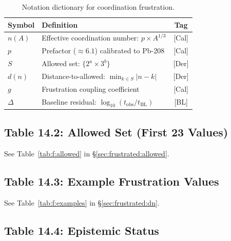 \begin{table}[h]
\centering
\caption{Notation dictionary for coordination frustration.}
\label{tab:f:notation}
\begin{tabular}{lp{7cm}c}
    \toprule
    Symbol & Definition & Tag \\
    \midrule
    $n(A)$ & Effective coordination number: $p \times A^{1/3}$ & [Cal] \\
    $p$ & Prefactor ($\approx 6.1$) calibrated to Pb-208 & [Cal] \\
    $S$ & Allowed set: $\{2^a \times 3^b\}$ & [Der] \\
    $d(n)$ & Distance-to-allowed: $\min_{k \in S}|n - k|$ & [Der] \\
    $g$ & Frustration coupling coefficient & [Cal] \\
    $\Delta$ & Baseline residual: $\log_{10}(t_{\text{obs}}/t_{\text{BL}})$ & [BL] \\
    \bottomrule
\end{tabular}
\end{table}

\subsection{Table 14.2: Allowed Set (First 23 Values)}

See Table~\ref{tab:f:allowed} in \S\ref{sec:frustrated:allowed}.

\subsection{Table 14.3: Example Frustration Values}

See Table~\ref{tab:f:examples} in \S\ref{sec:frustrated:dn}.

\subsection{Table 14.4: Epistemic Status}

